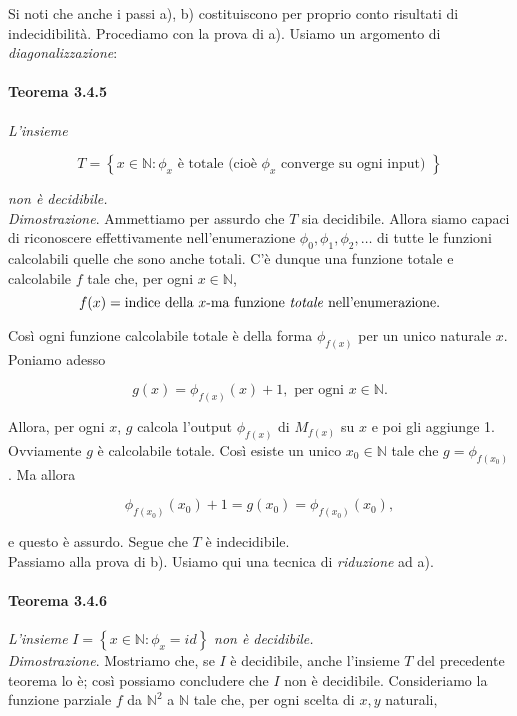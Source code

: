 Si noti che anche i passi a), b) costituiscono per proprio conto risultati di indecidibilità.
Procediamo con la prova di a). Usiamo un argomento di \textit{diagonalizzazione}:

\paragraph{Teorema 3.4.5} \textit{L'insieme}

\[
    T=\left\{x \in \mathbb{N}: \phi_x \text { è totale (cioè } \phi_x \text { converge su ogni input) }\right\}
\]

\textit{non è decidibile.}\\

\textit{Dimostrazione}. Ammettiamo per assurdo che $T$ sia decidibile.
Allora siamo capaci di riconoscere effettivamente nell'enumerazione $\phi_0,
    \phi_1, \phi_2, \ldots$ di tutte le funzioni calcolabili quelle che sono anche
totali. C'è dunque una funzione totale e calcolabile $f$ tale che, per ogni $x
    \in \mathbb{N}$,
\[
    f(x)= \text{indice della } x \text{-ma funzione \textit{totale} nell'enumerazione}.
\]

Così ogni funzione calcolabile totale è della forma $\phi_{f(x)}$ per un unico
naturale $x$. Poniamo adesso

\[
    g(x)=\phi_{f(x)}(x)+1, \text { per ogni } x \in \mathbb{N} .
\]

Allora, per ogni $x$, $g$ calcola l'output $\phi_{f(x)}$ di $M_{f(x)}$ su $x$ e
poi gli aggiunge 1. Ovviamente $g$ è calcolabile totale. Così esiste un unico
$x_0 \in \mathbb{N}$ tale che $g=\phi_{f\left(x_0\right)}$. Ma allora

\[
    \phi_{f\left(x_0\right)}\left(x_0\right)+1=g\left(x_0\right)=\phi_{f\left(x_0\right)}\left(x_0\right),
\]

e questo è assurdo. Segue che $T$ è indecidibile.\\

Passiamo alla prova di b).
Usiamo qui una tecnica di \textit{riduzione} ad a).

\paragraph{Teorema 3.4.6} \textit{L'insieme} $I=\left\{x
    \in \mathbb{N}: \phi_x=i d\right\}$ \textit{non è decidibile.}\\

\textit{Dimostrazione}. Mostriamo
che, se $I$ è decidibile, anche l'insieme $T$ del precedente teorema lo è; così
possiamo concludere che $I$ non è decidibile. Consideriamo la funzione parziale
$f$ da $\mathbb{N}^2$ a $\mathbb{N}$ tale che, per ogni scelta di $x, y$
naturali,

